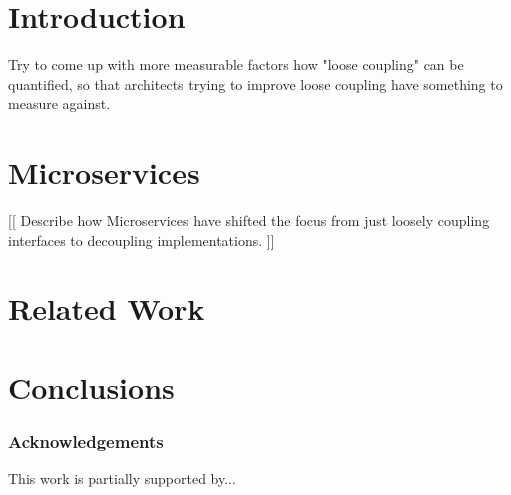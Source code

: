 \documentclass[sigconf]{acmart}
\begin{document}


\title{}



\author{Erik Wilde}

\author{Cesare Pautasso}


\begin{abstract}

\end{abstract}

%

\begin{CCSXML}

\end{CCSXML}




\maketitle

\section{Introduction}

\cite{pau09a}

Try to come up with more measurable factors how "loose coupling" can be quantified, so that architects trying to improve loose coupling have something to measure against.

\section{Microservices}\label{microservices}

[[ Describe how Microservices have shifted the focus from just loosely coupling interfaces to decoupling implementations. ]]


\section{Related Work}

\section{Conclusions}


\subsubsection*{Acknowledgements}

This work is partially supported by...


 
\end{document}
